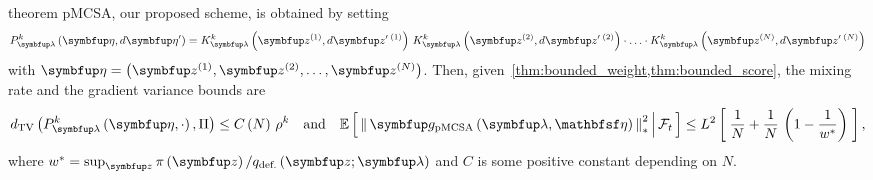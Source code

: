 
\begin{theoremEnd}{theorem}\label{thm:pmcsa}
  pMCSA, our proposed scheme, is obtained by setting
  {%
  \begin{align*}
    P_{\vlambda}^k\left(\veta, d\veta^{\prime}\right)
    = 
    K_{\vlambda}^k\left(\vz^{(1)}, d\vz^{\prime\; (1)}\right)
    \,
    K_{\vlambda}^k\left(\vz^{(2)}, d\vz^{\prime\; (2)}\right)
    \cdot
    \ldots 
    \cdot
    K_{\vlambda}^k\left(\vz^{(N)}, d\vz^{\prime\; (N)}\right)
  \end{align*}
  }
  with \(\veta = \left(\vz^{(1)}, \vz^{(2)}, \ldots, \vz^{(N)}\right)\).
  Then, given~\cref{thm:bounded_weight,thm:bounded_score}, the mixing rate and the gradient variance bounds are
  {%
  \begin{align*}
    \DTV{P_{\vlambda}^k\left(\veta, \cdot\right)}{\Pi}
    \leq
    C\left(N\right)\,{\rho^k}
    \quad\text{and}\quad
    \E{ \norm{ \vg_{\mathrm{pMCSA}}\left(\vlambda, \rvveta\right) }^2_{*} \,\middle|\, \mathcal{F}_{t} }
    \leq
    L^2 \left[\; \frac{1}{N} + \frac{1}{N}\,\left(1 - \frac{1}{w^*}\right) \;\right],
  \end{align*}
  }
  where \(w^* = \sup_{\vz} \pi\left(\vz\right) / q_{\text{def.}}\left(\vz;\vlambda\right)\) and \(C\) is some positive constant depending on \(N\).
\end{theoremEnd}
